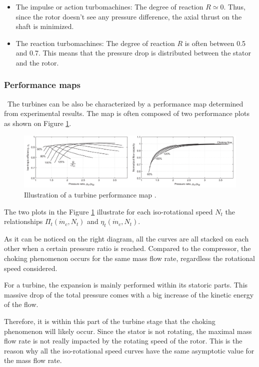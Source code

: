 \begin{itemize}
    \item The impulse or action turbomachines: The degree of reaction \(R\simeq 0\). Thus, since the rotor doesn't see any pressure difference, the axial thrust on the shaft is minimized. 
    \item The reaction turbomachines: The degree of reaction \(R\) is often between 0.5 and 0.7. This means that the pressure drop is distributed between the stator and the rotor.
\end{itemize}

\subsubsection{Performance maps}
\quad\ The turbines can be also be characterized by a performance map determined from experimental results. The map is often composed of two performance plots as shown on Figure \ref{fig:C4_turbmap}.

\begin{figure}[h]
    \centering
    \includegraphics[width=\textwidth]{Turb_Map.png}
    \caption{Illustration of a turbine performance map \cite{Dixon2013}.}
    \label{fig:C4_turbmap}
\end{figure}

The two plots in the Figure \ref{fig:C4_turbmap} illustrate for each iso-rotational speed \(N_t\) the relationships \(\Pi_t(\dot{m}_c,N_t)\) and \(\eta_t(\dot{m}_c,N_t)\). 

As it can be noticed on the right diagram, all the curves are all stacked on each other when a certain pressure ratio is reached. Compared to the compressor, the choking phenomenon occurs for the same mass flow rate, regardless the rotational speed considered. 

For a turbine, the expansion is mainly performed within its statoric parts. This massive drop of the total pressure comes with a big increase of the kinetic energy of the flow. 

Therefore, it is within this part of the turbine stage that the choking phenomenon will likely occur. Since the stator is not rotating, the maximal mass flow rate is not really impacted by the rotating speed of the rotor. This is the reason why all the iso-rotational speed curves have the same asymptotic value for the mass flow rate.


